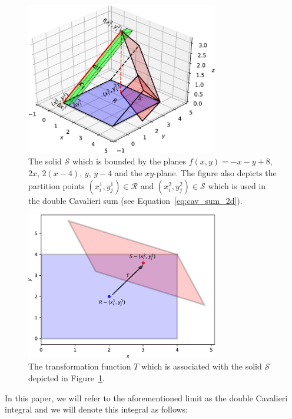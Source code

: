 \documentclass{article}
\theoremstyle{theorem}
\theoremstyle{definition}
\begin{document}
\begin{figure}[htb]
\centering
\includegraphics[width=0.75\textwidth]{prismatoid_solid.pdf}
\caption{The solid $\mathcal{S}$ which is bounded by the planes $f(x,y)=-x-y+8$, $2x$, $2(x-4)$, $y$, $y-4$ and the $xy$-plane. The figure also depicts the partition 
points $(x_i^1,y_j^1)\in\mathcal{R}$ and $(x_i^2,y_j^2)\in\mathcal{S}$ which is used in the double Cavalieri sum (see Equation~\eqref{eq:cav_sum_2d}).}
\label{fig:prismatoid_solid}
\end{figure}

\begin{figure}[htb]
\centering
\includegraphics[width=0.75\textwidth]{prismatoid_regions.pdf}
\caption{The transformation function $T$ which is associated with the solid $\mathcal{S}$ depicted in Figure~\ref{fig:prismatoid_solid}.}
\label{fig:prismatoid_regions}
\end{figure}

\noindent
In this paper, we will refer to the aforementioned limit as the double Cavalieri integral and we will denote this integral as follows:
\end{document}
